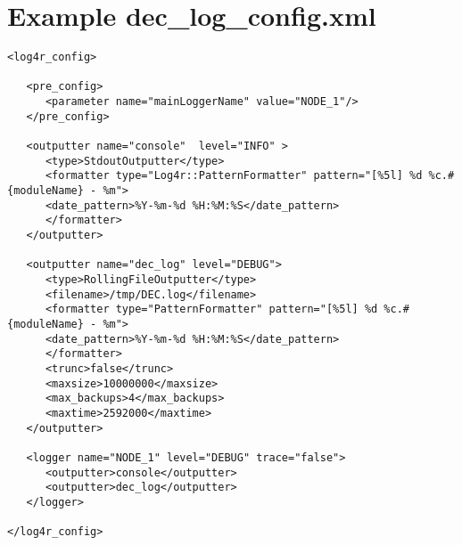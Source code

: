 \documentclass[dec_sum_main.tex]{subfiles}
\begin{document}
\section{Example dec\_log\_config.xml}
\begin{verbatim}
<log4r_config>

   <pre_config>
      <parameter name="mainLoggerName" value="NODE_1"/>
   </pre_config>

   <outputter name="console"  level="INFO" >
      <type>StdoutOutputter</type>
      <formatter type="Log4r::PatternFormatter" pattern="[%5l] %d %c.#{moduleName} - %m">
      <date_pattern>%Y-%m-%d %H:%M:%S</date_pattern>
      </formatter>
   </outputter>

   <outputter name="dec_log" level="DEBUG">
      <type>RollingFileOutputter</type>
      <filename>/tmp/DEC.log</filename>
      <formatter type="PatternFormatter" pattern="[%5l] %d %c.#{moduleName} - %m">
      <date_pattern>%Y-%m-%d %H:%M:%S</date_pattern>
      </formatter>
      <trunc>false</trunc>
      <maxsize>10000000</maxsize>
      <max_backups>4</max_backups>
      <maxtime>2592000</maxtime>
   </outputter>

   <logger name="NODE_1" level="DEBUG" trace="false">
      <outputter>console</outputter>
      <outputter>dec_log</outputter>
   </logger>

</log4r_config>

\end{verbatim}
\end{document}
